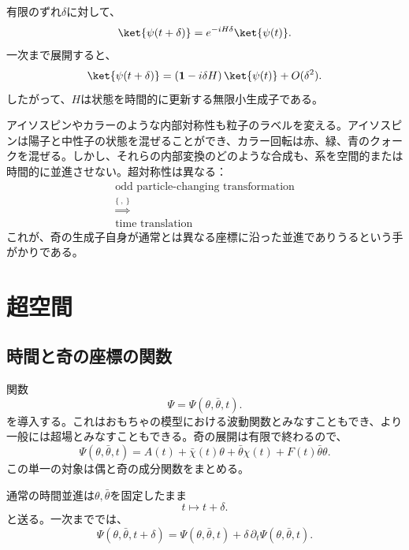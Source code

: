 有限のずれ\(\delta\)に対して、
\begin{equation}
\ket{\psi(t+\delta)}
=e^{-iH\delta}\ket{\psi(t)}.
\end{equation}
一次まで展開すると、
\begin{equation}
\ket{\psi(t+\delta)}
=\left(\mathbf 1-i\delta H\right)\ket{\psi(t)}
+O(\delta^2).
\end{equation}
したがって、\(H\)は状態を時間的に更新する無限小生成子である。

アイソスピンやカラーのような内部対称性も粒子のラベルを変える。アイソスピンは陽子と中性子の状態を混ぜることができ、カラー回転は赤、緑、青のクォークを混ぜる。しかし、それらの内部変換のどのような合成も、系を空間的または時間的に並進させない。超対称性は異なる：
\begin{equation}
\begin{gathered}
\text{odd particle-changing transformation}\\
\mathrel{\stackrel{\{\ ,\ \}}{\Longrightarrow}}\\
\text{time translation}
\end{gathered}
\end{equation}
これが、奇の生成子自身が通常とは異なる座標に沿った並進でありうるという手がかりである。

\section{超空間}

\subsection{時間と奇の座標の関数}

関数
\begin{equation}
\Psi=\Psi(\theta,\bar\theta,t).
\end{equation}
を導入する。これはおもちゃの模型における波動関数とみなすこともでき、より一般には超場とみなすこともできる。奇の展開は有限で終わるので、
\begin{equation}
\Psi(\theta,\bar\theta,t)
=A(t)+\bar\chi(t)\theta
+\bar\theta\chi(t)+F(t)\bar\theta\theta.
\end{equation}
この単一の対象は偶と奇の成分関数をまとめる。

通常の時間並進は\(\theta,\bar\theta\)を固定したまま
\begin{equation}
t\longmapsto t+\delta.
\end{equation}
と送る。一次まででは、
\begin{equation}
\Psi(\theta,\bar\theta,t+\delta)
=\Psi(\theta,\bar\theta,t)
+\delta\,\partial_t\Psi(\theta,\bar\theta,t).
\end{equation}

